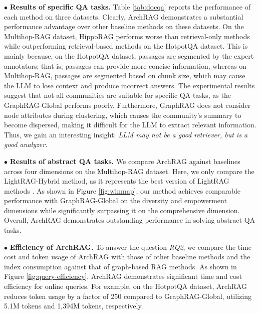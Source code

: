 $\bullet$ \textbf{Results of specific QA tasks.}
Table \ref{tab:docqa} reports the performance of each method on three datasets.
% 
Clearly, {ArchRAG} demonstrates a substantial performance advantage over other baseline methods on these datasets.
% 
On the Multihop-RAG dataset, {HippoRAG} performs worse than retrieval-only methods while outperforming retrieval-based methods on the HotpotQA dataset.
% 
This is mainly because, on the HotpotQA dataset, passages are segmented by the expert annotators; that is, passages can provide more concise information, whereas on  Multihop-RAG, passages are segmented based on chunk size, which may cause the LLM to lose context and produce incorrect answers.
% 
The experimental results suggest that not all communities are suitable for specific QA tasks, as the {GraphRAG-Global} performs poorly. 
% 
Furthermore, GraphRAG does not consider node attributes during clustering, which causes the community's summary to become dispersed, making it difficult for the LLM to extract relevant information.
% 
Thus, we gain an interesting insight: {\it LLM may not be a good retriever, but is a good analyzer.}
% 
% 




$\bullet$ \textbf{Results of abstract QA tasks.}
We compare {ArchRAG} against baselines across four dimensions on the Multihop-RAG dataset.
% 
Here, we only compare the {LightRAG-Hybrid} method, as it represents the best version of {LightRAG} methods \cite{guo2024lightrag}.
% 
As shown in Figure \ref{fig:winmap}, our method achieves comparable performance with {GraphRAG-Global} on the diversity and empowerment dimensions while significantly surpassing it on the comprehensive dimension.
% 
Overall, {ArchRAG} demonstrates outstanding performance in solving abstract QA tasks.


$\bullet$ \textbf{Efficiency of {ArchRAG}.}
To answer the question \textit{RQ2}, we compare the time cost and token usage of {ArchRAG} with those of other baseline methods and the index consumption against that of graph-based RAG methods.
%
As shown in Figure \ref{fig:query-efficiency}, {ArchRAG} demonstrates significant time and cost efficiency for online queries.
% 
For example, on the HotpotQA dataset, {ArchRAG} reduces token usage by a factor of 250 compared to {GraphRAG-Global}, utilizing 5.1M tokens and 1,394M tokens, respectively.

